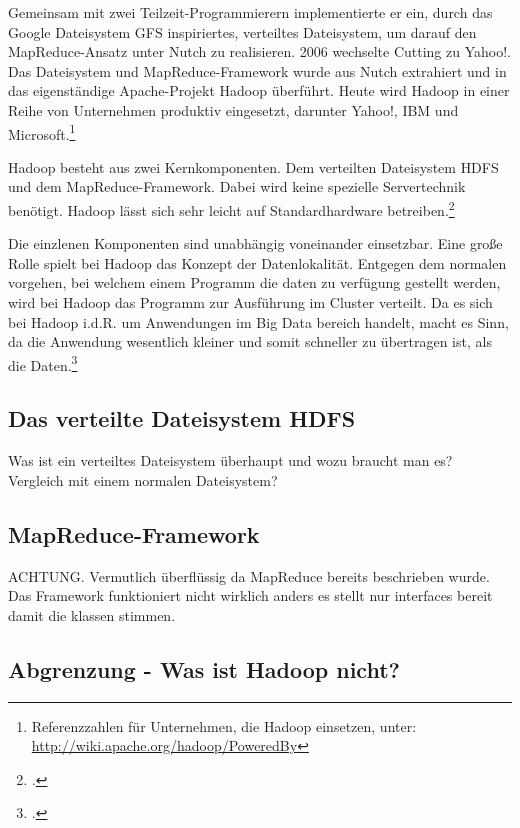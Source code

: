 Gemeinsam mit zwei Teilzeit-Programmierern implementierte er ein, durch das Google Dateisystem \ac{GFS} inspiriertes, verteiltes Dateisystem, um darauf den MapReduce-Ansatz unter Nutch zu realisieren. 2006 wechselte Cutting zu Yahoo!. Das Dateisystem und MapReduce-Framework wurde aus Nutch extrahiert und in das eigenständige Apache-Projekt Hadoop überführt. Heute wird Hadoop in einer Reihe von Unternehmen produktiv eingesetzt, darunter Yahoo!, IBM und Microsoft.\footnote{Referenzzahlen für Unternehmen, die Hadoop einsetzen, unter:\\ \url{http://wiki.apache.org/hadoop/PoweredBy}}

Hadoop besteht aus zwei Kernkomponenten. Dem verteilten Dateisystem \ac{HDFS} und dem MapReduce-Framework. Dabei wird keine spezielle Servertechnik benötigt. Hadoop lässt sich sehr leicht auf Standardhardware betreiben.\footcite[Vgl.][S. 19-22]{Wartala.2012}

Die einzlenen Komponenten sind unabhängig voneinander einsetzbar. Eine große Rolle spielt bei Hadoop das Konzept der Datenlokalität. Entgegen dem normalen vorgehen, bei welchem einem Programm die daten zu verfügung gestellt werden, wird bei Hadoop das Programm zur Ausführung im Cluster verteilt. Da es sich bei Hadoop i.d.R. um Anwendungen im Big Data bereich handelt, macht es Sinn, da die Anwendung wesentlich kleiner und somit schneller zu übertragen ist, als die Daten.\footcite[Vgl.][S. 20]{Freiknecht.2014}

\subsection{Das verteilte Dateisystem HDFS}\label{subsec:DasVerteilteDateisystemHDFS}
Was ist ein verteiltes Dateisystem überhaupt und wozu braucht man es? Vergleich mit einem normalen Dateisystem?

\subsection{MapReduce-Framework}\label{subsec:MapReduceFramework}
ACHTUNG. Vermutlich überflüssig da MapReduce bereits beschrieben wurde. Das Framework funktioniert nicht wirklich anders es stellt nur interfaces bereit damit die klassen stimmen.

\subsection{Abgrenzung - Was ist Hadoop nicht?}


